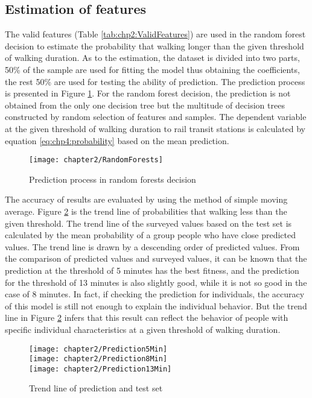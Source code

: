 %
\subsection{Estimation of features}
The valid features (Table \ref{tab:chp2:ValidFeatures}) are used in the random forest decision to estimate the probability that walking longer than the given threshold of walking duration. As to the estimation, the dataset is divided into two parts, 50\% of the sample are used for fitting the model thus obtaining the coefficients, the rest 50\% are used for testing the ability of prediction. The prediction process is presented in Figure \ref{fig:chp2:RandomForests}. For the random forest decision, the prediction is not obtained from the only one decision tree but the multitude of decision trees constructed by random selection of features and samples. The dependent variable at the given threshold of walking duration to rail transit stations is calculated by equation \ref{eq:chp4:probability} based on the mean prediction.

\begin{figure}[htbp]
	\centering
	\texttt{[image: chapter2/RandomForests]}
	\caption{Prediction process in random forests decision}
	\label{fig:chp2:RandomForests}
\end{figure}

%
The accuracy of results are evaluated by using the method of simple moving average. Figure \ref{fig:chp2:Prediction} is the trend line of probabilities that walking less than the given threshold. The trend line of the surveyed values based on the test set is calculated by the mean probability of a group people who have close predicted values. The trend line is drawn by a descending order of predicted values. From the comparison of predicted values and surveyed values, it can be known that the prediction at the threshold of 5 minutes has the best fitness, and the prediction for the threshold of 13 minutes is also slightly good, while it is not so good in the case of 8 minutes. In fact, if checking the prediction for individuals, the accuracy of this model is still not enough to explain the individual behavior. But the trend line in Figure \ref{fig:chp2:Prediction} infers that this result can reflect the behavior of people with specific individual characteristics at a given threshold of walking duration. 

\begin{figure}[htbp]
	\centering
	\texttt{[image: chapter2/Prediction5Min]} \\
	\texttt{[image: chapter2/Prediction8Min]} \\
	\texttt{[image: chapter2/Prediction13Min]} \\
	\caption{Trend line of prediction and test set}
	\label{fig:chp2:Prediction}
\end{figure}


